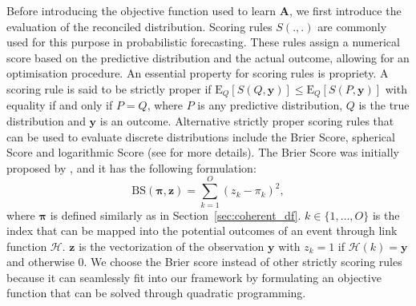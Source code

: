 \documentclass[a4paper,review,12pt,authoryear]{elsarticle}
\newcommand{\bpi}{\bm{\pi}}
\theoremstyle{definition}
\begin{document}
    Before introducing the objective function used to learn $\bm{A}$, we first introduce the evaluation of the reconciled distribution.
    Scoring rules $S(.,.)$ are commonly used for this purpose in probabilistic forecasting.
    These rules assign a numerical score based on the predictive distribution and the actual outcome, allowing for an optimisation procedure.
    An essential property for scoring rules is propriety. A scoring rule is said to be strictly proper if $\text{E}_Q[S(Q, \mathbf{y})] \leq \text{E}_Q[S(P, \mathbf{y})]$ with equality if and only if $P=Q$, where $P$ is any predictive distribution, $Q$ is the true distribution and $\mathbf{y}$ is an outcome.
    Alternative strictly proper scoring rules that can be used to evaluate discrete distributions include the Brier Score, spherical Score and logarithmic Score (see \citealp{gneitingStrictlyProperScoring2007} for more details).
    The Brier Score was initially proposed by \cite{brier1950verification}, and it has the following formulation:
    \[
      \text{BS}(\bpi, \mathbf{z}) = \sum_{k=1}^{O}(z_k - \pi_k)^2,
    \] where $\bpi$ is defined similarly as in Section~\ref{sec:coherent_df}.
    $k\in \{1,\dots,O\}$ is the index that can be mapped into the potential outcomes of an event through link function $\mathcal{H}$. $\mathbf{z}$ is the vectorization of the observation $\mathbf{y}$ with $z_k = 1$ if $\mathcal{H}(k) = \mathbf{y}$ and otherwise $0$.
    We choose the Brier score instead of other strictly scoring rules because it can seamlessly fit into our framework by formulating an objective function that can be solved through quadratic programming.
\end{document}
